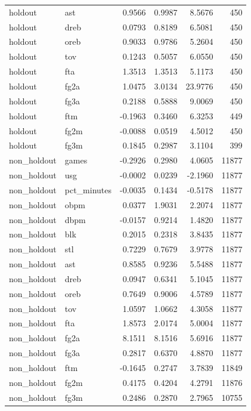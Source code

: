 \begin{table}
\begin{tabular}{llrrrr}
holdout & ast & 0.9566 & 0.9987 & 8.5676 & 450 \\
holdout & dreb & 0.0793 & 0.8189 & 6.5081 & 450 \\
holdout & oreb & 0.9033 & 0.9786 & 5.2604 & 450 \\
holdout & tov & 0.1243 & 0.5057 & 6.0550 & 450 \\
holdout & fta & 1.3513 & 1.3513 & 5.1173 & 450 \\
holdout & fg2a & 1.0475 & 3.0134 & 23.9776 & 450 \\
holdout & fg3a & 0.2188 & 0.5888 & 9.0069 & 450 \\
holdout & ftm & -0.1963 & 0.3460 & 6.3253 & 449 \\
holdout & fg2m & -0.0088 & 0.0519 & 4.5012 & 450 \\
holdout & fg3m & 0.1845 & 0.2987 & 3.1104 & 399 \\
non\_holdout & games & -0.2926 & 0.2980 & 4.0605 & 11877 \\
non\_holdout & usg & -0.0002 & 0.0239 & -2.1960 & 11877 \\
non\_holdout & pct\_minutes & -0.0035 & 0.1434 & -0.5178 & 11877 \\
non\_holdout & obpm & 0.0377 & 1.9031 & 2.2074 & 11877 \\
non\_holdout & dbpm & -0.0157 & 0.9214 & 1.4820 & 11877 \\
non\_holdout & blk & 0.2015 & 0.2318 & 3.8435 & 11877 \\
non\_holdout & stl & 0.7229 & 0.7679 & 3.9778 & 11877 \\
non\_holdout & ast & 0.8585 & 0.9236 & 5.5488 & 11877 \\
non\_holdout & dreb & 0.0947 & 0.6341 & 5.1045 & 11877 \\
non\_holdout & oreb & 0.7649 & 0.9006 & 4.5789 & 11877 \\
non\_holdout & tov & 1.0597 & 1.0662 & 4.3058 & 11877 \\
non\_holdout & fta & 1.8573 & 2.0174 & 5.0004 & 11877 \\
non\_holdout & fg2a & 8.1511 & 8.1516 & 5.6916 & 11877 \\
non\_holdout & fg3a & 0.2817 & 0.6370 & 4.8870 & 11877 \\
non\_holdout & ftm & -0.1645 & 0.2747 & 3.7839 & 11849 \\
non\_holdout & fg2m & 0.4175 & 0.4204 & 4.2791 & 11876 \\
non\_holdout & fg3m & 0.2486 & 0.2870 & 2.7965 & 10755 \\
\bottomrule
\end{tabular}
\end{table}
